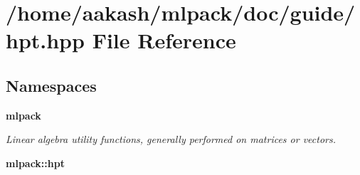 \section{/home/aakash/mlpack/doc/guide/hpt.hpp File Reference}
\label{doc_2guide_2hpt_8hpp}
\subsection*{Namespaces}
\begin{DoxyCompactItemize}
\item 
 \textbf{ mlpack}
\begin{DoxyCompactList}\small\item\em Linear algebra utility functions, generally performed on matrices or vectors. \end{DoxyCompactList}\item 
 \textbf{ mlpack\+::hpt}
\end{DoxyCompactItemize}
